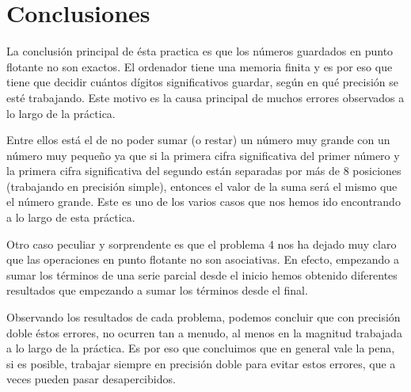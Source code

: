 \documentclass[a4paper]{article}
\begin{document}
\section*{Conclusiones} 
La conclusión principal de ésta practica es que los números guardados en punto flotante no son exactos. El ordenador tiene una memoria finita y es por eso que tiene que decidir cuántos dígitos significativos guardar, según en qué precisión se esté trabajando. Este motivo es la causa principal de muchos errores observados a lo largo de la práctica.\par Entre ellos está el de no poder sumar (o restar) un número muy grande con un número muy pequeño ya que si la primera cifra significativa del primer número y la primera cifra significativa del segundo están separadas por más de 8 posiciones (trabajando en precisión simple), entonces el valor de la suma será el mismo que el número grande. Este es uno de los varios casos que nos hemos ido encontrando a lo largo de esta práctica.\par Otro caso peculiar y sorprendente es que el problema 4 nos ha dejado muy claro que las operaciones en punto flotante no son asociativas. En efecto, empezando a sumar los términos de una serie parcial desde el inicio hemos obtenido diferentes resultados que empezando a sumar los términos desde el final.\par Observando los resultados de cada problema, podemos concluir que con precisión doble éstos errores, no ocurren tan a menudo, al menos en la magnitud trabajada a lo largo de la práctica. Es por eso que concluimos que en general vale la pena, si es posible, trabajar siempre en precisión doble para evitar estos errores, que a veces pueden pasar desapercibidos.
\end{document}
